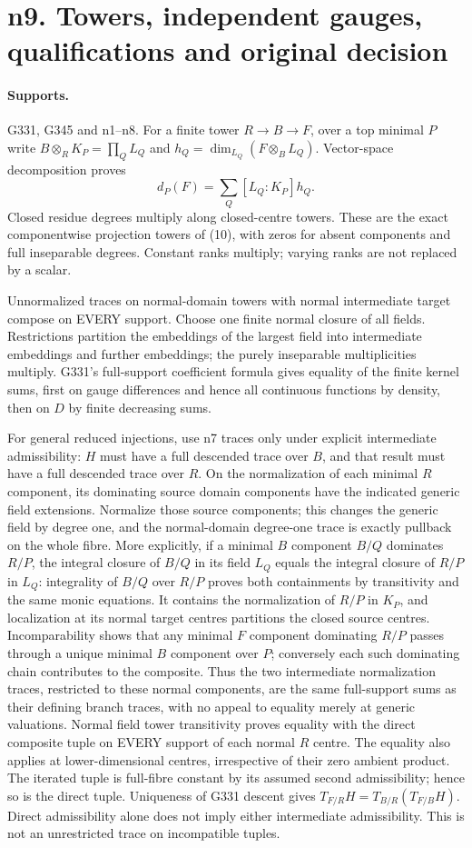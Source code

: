 \section{n9. Towers, independent gauges, qualifications and original decision}
\paragraph{Supports.} G331, G345 and n1--n8.
For a finite tower $R\to B\to F$, over a top minimal $P$ write
$B\otimes_RK_P=\prod_Q L_Q$ and $h_Q=\dim_{L_Q}(F\otimes_BL_Q)$. Vector-space decomposition proves
\[
 d_P(F)=\sum_Q[L_Q:K_P]h_Q. \tag{21}
\]
Closed residue degrees multiply along closed-centre towers. These are the exact componentwise projection towers of (10), with zeros for absent components and full inseparable degrees. Constant ranks multiply; varying ranks are not replaced by a scalar.

Unnormalized traces on normal-domain towers with normal intermediate target compose on EVERY support. Choose one finite normal closure of all fields. Restrictions partition the embeddings of the largest field into intermediate embeddings and further embeddings; the purely inseparable multiplicities multiply. G331's full-support coefficient formula gives equality of the finite kernel sums, first on gauge differences and hence all continuous functions by density, then on $D$ by finite decreasing sums.

For general reduced injections, use n7 traces only under explicit intermediate admissibility: $H$ must have a full descended trace over $B$, and that result must have a full descended trace over $R$. On the normalization of each minimal $R$ component, its dominating source domain components have the indicated generic field extensions. Normalize those source components; this changes the generic field by degree one, and the normal-domain degree-one trace is exactly pullback on the whole fibre. More explicitly, if a minimal $B$ component $B/Q$ dominates $R/P$, the integral closure of $B/Q$ in its field $L_Q$ equals the integral closure of $R/P$ in $L_Q$: integrality of $B/Q$ over $R/P$ proves both containments by transitivity and the same monic equations. It contains the normalization of $R/P$ in $K_P$, and localization at its normal target centres partitions the closed source centres. Incomparability shows that any minimal $F$ component dominating $R/P$ passes through a unique minimal $B$ component over $P$; conversely each such dominating chain contributes to the composite. Thus the two intermediate normalization traces, restricted to these normal components, are the same full-support sums as their defining branch traces, with no appeal to equality merely at generic valuations. Normal field tower transitivity proves equality with the direct composite tuple on EVERY support of each normal $R$ centre. The equality also applies at lower-dimensional centres, irrespective of their zero ambient product. The iterated tuple is full-fibre constant by its assumed second admissibility; hence so is the direct tuple. Uniqueness of G331 descent gives $T_{F/R}H=T_{B/R}(T_{F/B}H)$. Direct admissibility alone does not imply either intermediate admissibility. This is not an unrestricted trace on incompatible tuples.

